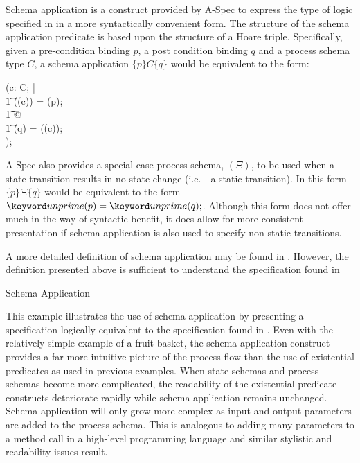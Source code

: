 \documentclass[letterpaper,10pt,draft]{book}
\begin{document}
Schema application is a construct provided by A-Spec to express the type of logic
specified in  in a more syntactically convenient form.  The structure
of the schema application predicate is based upon the structure of a Hoare triple.
Specifically, given a pre-condition binding $p$, a post condition binding $q$ and
a process schema type $C$, a schema application $\{p\} C \{q\}$ would be equivalent
to the form:

\begin{zed}
   \exists(c: C; | \\
      \t1 \unprime(\pre(c)) = \unprime(p); \\
      \t1 @ \\
      \t1 \unprime(q) = \unprime(\post(c)); \\
   );
\end{zed}

A-Spec also provides a special-case process schema, $(\Xi)$, to be used when a state-transition
results in no state change (i.e. - a static transition).  In this form $\{p\} \Xi \{q\}$
would be equivalent to the form $\unprime(p) = \unprime(q);$.  Although this form
does not offer much in the way of syntactic benefit, it does allow for more consistent
presentation if schema application is also used to specify non-static transitions.

A more detailed definition of schema application may be found in .
However, the definition presented above is sufficient to understand the specification
found in 

\begin{example}
\begin{minipage}[t]{0.55\linewidth}
   
\end{minipage}
\begin{minipage}[t]{0.44\linewidth}
   \azsch
   
\end{minipage}

   \caption{Schema Application}
   \label{ex:SchAppl}
\end{example}

This example illustrates the use of schema application by presenting a specification
logically equivalent to the specification found in .  Even with
the relatively simple example of a fruit basket, the schema application construct
provides a far more intuitive picture of the process flow than the use of existential
predicates as used in previous examples.  When state schemas and process schemas
become more complicated, the readability of the existential predicate constructs
deteriorate rapidly while schema application remains unchanged.  Schema application
will only grow more complex as input and output parameters are added to the process
schema.  This is analogous to adding many parameters to a method call in a high-level
programming language and similar stylistic and readability issues result.
\end{document}
